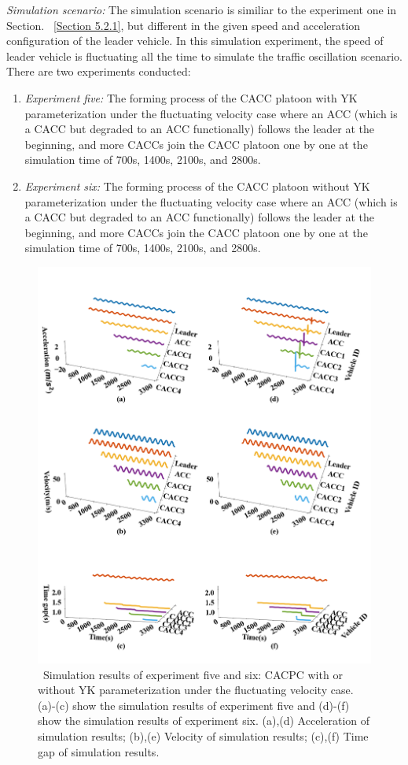 \documentclass[a4paper,fleqn]{cas-sc}
\begin{document}
\textit{Simulation scenario:} The simulation scenario is similiar to the experiment one in Section. ~\ref{Section 5.2.1}, but different in the given speed and acceleration configuration of the leader vehicle. In this simulation experiment, the speed of leader vehicle is fluctuating all the time to simulate the traffic oscillation scenario. There are two experiments conducted:
\begin{enumerate}
  \item \textit{Experiment five:} The forming process of the CACC platoon with YK parameterization under the fluctuating velocity case where an ACC (which is a CACC but degraded to an ACC functionally) follows the leader at the beginning, and more CACCs join the CACC platoon one by one at the simulation time of 700s, 1400s, 2100s, and 2800s.
  \item \textit{Experiment six:} The forming process of the CACC platoon without YK parameterization under the fluctuating velocity case where an ACC (which is a CACC but degraded to an ACC functionally) follows the leader at the beginning, and more CACCs join the CACC platoon one by one at the simulation time of 700s, 1400s, 2100s, and 2800s.
\end{enumerate}

\begin{figure}
  \centering
  \includegraphics[width=14cm]{figs/f_YK_form.png}
  \caption{~Simulation results of experiment five and six: CACPC with or without YK parameterization under the fluctuating velocity case. (a)-(c) show the simulation results of experiment five and (d)-(f) show the simulation results of experiment six. (a),(d) Acceleration of simulation results; (b),(e) Velocity of simulation results; (c),(f) Time gap of simulation results.}
  \label{new5}
\end{figure}
\end{document}
